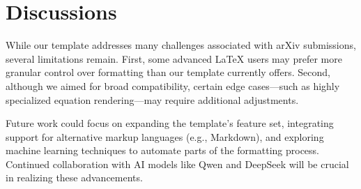 \vspace{-2mm}
\section{Discussions}

While our template addresses many challenges associated with arXiv submissions, several limitations remain. First, some advanced LaTeX users may prefer more granular control over formatting than our template currently offers. Second, although we aimed for broad compatibility, certain edge cases—such as highly specialized equation rendering—may require additional adjustments.

Future work could focus on expanding the template's feature set, integrating support for alternative markup languages (e.g., Markdown), and exploring machine learning techniques to automate parts of the formatting process. Continued collaboration with AI models like Qwen and DeepSeek will be crucial in realizing these advancements.